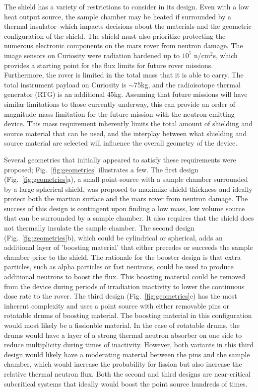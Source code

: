 \documentclass{mc2015}
\begin{document}
The shield has a variety of restrictions to consider in its design. Even with a low heat output source, the sample chamber may be heated if surrounded by a thermal insulator--which impacts decisions about the materials and the geometric configuration of the shield. The shield must also prioritize protecting the numerous electronic components on the mars rover from neutron damage. The image sensors on Curiosity were radiation hardened up to  $10^{7}$ n/cm$^2$s, which provides a starting point for the flux limits for future rover missions. Furthermore, the rover is limited in the total mass that it is able to carry. The total instrument payload on Curiosity is $\sim$75kg, and the radioisotope thermal generator (RTG) is an additional 45kg. Assuming that future missions will have similar limitations to those currently underway, this can provide an order of magnitude mass limitation for the future mission with the neutron emitting device. This mass requirement inherently limits the total amount of shielding and source material that can be used, and the interplay between what shielding and source material are selected will influence the overall geometry of the device. 

Several geometries that initially appeared to satisfy these requirements were proposed; Fig.\ \ref{fig:geometries} illustrates a few. The first design (Fig.\ \ref{fig:geometries}a), a small point-source with a sample chamber surrounded by a large spherical shield, was proposed to maximize shield thickness and ideally protect both the martian surface and the mars rover from neutron damage. The success of this design is contingent upon finding a low mass, low volume source that can be surrounded by a sample chamber. It also requires that the shield does not thermally insulate the sample chamber. The second design (Fig.\ \ref{fig:geometries}b), which could be cylindrical or spherical, adds an additional layer of 'boosting material' that either precedes or succeeds the sample chamber prior to the shield. The rationale for the booster design is that extra particles, such as alpha particles or fast neutrons, could be used to produce additional neutrons to boost the flux. This boosting material could be removed from the device during periods of irradiation inactivity to lower the continuous dose rate to the rover. The third design (Fig.\ \ref{fig:geometries}c) has the most inherent complexity and uses a point source with either removable pins or rotatable drums of boosting material. The boosting material in this configuration would most likely be a fissionble material. In the case of rotatable drums, the drums would have a layer of a strong thermal neutron absorber on one side to reduce multiplicity during times of inactivity. However, both variants in this third design would likely have a moderating material between the pins and the sample chamber, which would increase the probability for fission but also increase the relative thermal neutron flux. Both the second and third designs are near-critical subcritical systems that ideally would boost the point source hundreds of times. 
\end{document}
